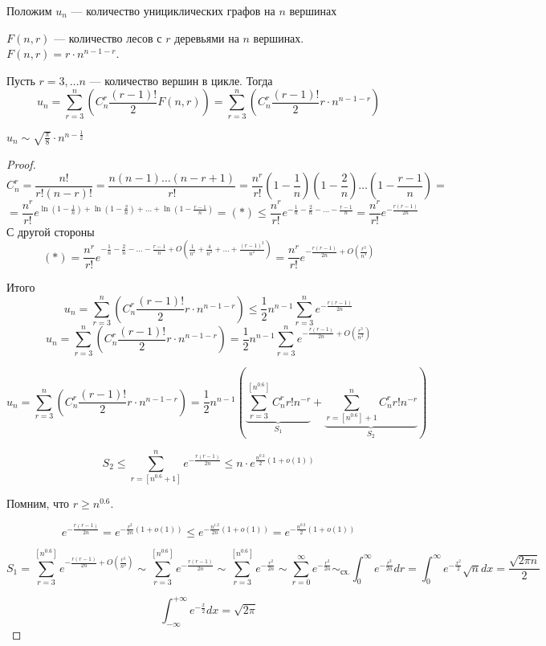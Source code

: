 Положим \(u_n\) --- количество унициклических графов на \(n\) вершинах

\begin{lemma}
    \(F(n, r)\) --- количество лесов с \(r\) деревьями на \(n\) вершинах. \(F(n, r) = r\cdot n^{n - 1 - r}\).
\end{lemma}

Пусть \(r = 3, \dots n\) --- количество вершин в цикле. Тогда
\[u_n = \sum_{r = 3}^n \left(C_n^r \frac{(r - 1)!}{2}F(n, r)\right) = \sum_{r = 3}^n \left(C_n^r \frac{(r - 1)!}{2}r \cdot n^{n - 1 - r}\right)\]

\begin{proposition}
    \(u_n \sim \sqrt{\frac{\pi}{8}}\cdot n^{n - \frac{1}{2}}\)
\end{proposition}

\begin{proof}
    \[C_n^r = \frac{n!}{r!(n - r)!} = \frac{n(n - 1)\dots(n - r + 1)}{r!} = \frac{n^r}{r!}\left(1 - \frac{1}{n}\right)\left(1 - \frac{2}{n}\right)\dots \left(1 - \frac{r-1}{n}\right) = \]
    \[= \frac{n^r}{r!}e^{\ln\left(1 - \frac{1}{n}\right) + \ln\left(1 - \frac{2}{n}\right) + \dots + \ln\left(1 - \frac{r-1}{n}\right)}  = (*) \le \frac{n^r}{r!}e^{-\frac{1}{n}-\frac{2}{n} - \dots - \frac{r - 1}{n}} = \frac{n^r}{r!}e^{-\frac{r(r-1)}{2n}}\]
    С другой стороны
    \[(*) = \frac{n^r}{r!}e^{-\frac{1}{n}-\frac{2}{n} - \dots - \frac{r - 1}{n} + O\left(\frac{1}{n^2} + \frac{4}{n^2} + \dots + \frac{(r - 1)^2}{n^2}\right)} = \frac{n^r}{r!}e^{-\frac{r(r-1)}{2n} + O\left(\frac{r^3}{n^3}\right)}\]

    Итого
    \[u_n = \sum_{r = 3}^n \left(C_n^r \frac{(r - 1)!}{2}r \cdot n^{n - 1 - r}\right) \le \frac{1}{2}n^{n - 1}\sum_{r = 3}^n e^{-\frac{r(r-1)}{2n}}\]
    \[u_n = \sum_{r = 3}^n \left(C_n^r \frac{(r - 1)!}{2}r \cdot n^{n - 1 - r}\right) = \frac{1}{2}n^{n - 1}\sum_{r = 3}^n e^{-\frac{r(r-1)}{2n} + O\left(\frac{r^3}{n^3}\right)}\]
    
    
    \[u_n = \sum_{r = 3}^n \left(C_n^r \frac{(r - 1)!}{2}r \cdot n^{n - 1 - r}\right) = \frac{1}{2}n^{n - 1}\left(\underbrace{\sum_{r = 3}^{[n^{0.6}]} C_n^r r! n^{-r}}_{S_1} + \underbrace{\sum_{r = [n^{0.6}] + 1}^{n} C_n^r r! n^{-r}}_{S_2}\right)\]

    \[S_2 \le \sum_{r = [n^{0.6} + 1]}^ne^{-\frac{r(r-1)}{2n}} \le n \cdot e^{\frac{n^{0.2}}{2}(1 + o(1))}\]
    
    Помним, что \(r \ge n^{0.6}\).

    \[e^{-\frac{r(r-1)}{2n}} = e^{-\frac{r^2}{2n}(1 + o(1))} \le e^{-\frac{n^{1.2}}{2n}(1 + o(1))} = e^{-\frac{n^{0.2}}{2}(1 + o(1))}\]

    \[S_1 = \sum_{r = 3}^{[n^{0.6}]}e^{-\frac{r(r-1)}{2n} + O\left(\frac{r^3}{n^3}\right)} \sim \sum_{r = 3}^{[n^{0.6}]}e^{-\frac{r(r-1)}{2n}} \sim \sum_{r = 3}^{[n^{0.6}]}e^{-\frac{r^2}{2n}} \sim \sum_{r = 0}^{\infty}e^{-\frac{r^2}{2n}} \sim_{\text{сх.}} \int_0^\infty e^{-\frac{r^2}{2n}}dr = \int_0^\infty e^{-\frac{x^2}{2}}\sqrt{n}dx = \frac{\sqrt{2\pi n}}{2}\]
    
    \[\int_{-\infty}^{+\infty} e^{-\frac{x}{2}}dx = \sqrt{2\pi}\]
\end{proof}